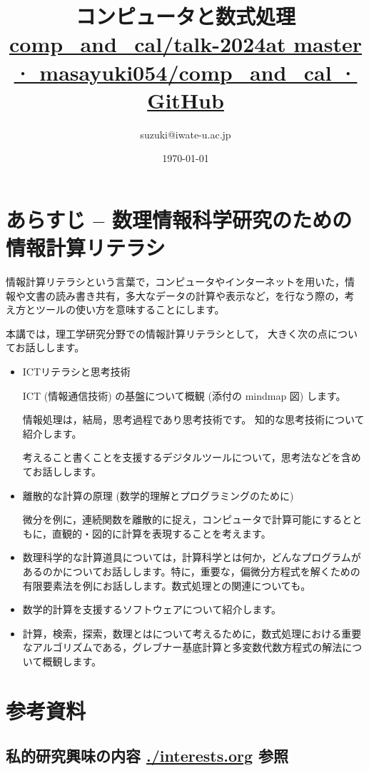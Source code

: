 \documentclass[dvipdfmx,11pat]{jarticle}
\author{suzuki@iwate-u.ac.jp}
\date{\today}
\title{ コンピュータと数式処理 \href{https://github.com/masayuki054/comp\_and\_cal/tree/master/talk-2024}{comp\_and\_cal/talk-2024at master · masayuki054/comp\_and\_cal · GitHub}}
\begin{document}
\maketitle
\section{あらすじ -- 数理情報科学研究のための情報計算リテラシ}
\label{sec:org7687947}

情報計算リテラシという言葉で，コンピュータやインターネットを用いた，情
報や文書の読み書き共有，多大なデータの計算や表示など，を行なう際の，考
え方とツールの使い方を意味することにします。

本講では，理工学研究分野での情報計算リテラシとして，
大きく次の点についてお話しします。

\begin{itemize}
\item ICTリテラシと思考技術

ICT (情報通信技術) の基盤について概観 (添付の mindmap 図) します。

情報処理は，結局，思考過程であり思考技術です。
知的な思考技術について紹介します。

考えること書くことを支援するデジタルツールについて，思考法などを含め
てお話しします。

\item 離散的な計算の原理 (数学的理解とプログラミングのために)

微分を例に，連続関数を離散的に捉え，コンピュータで計算可能にするとと
もに，直観的・図的に計算を表現することを考えます。

\item 数理科学的な計算道具については，計算科学とは何か，どんなプログラムが
あるのかについてお話しします。特に，重要な，偏微分方程式を解くための
有限要素法を例にお話しします。数式処理との関連についても。

\item 数学的計算を支援するソフトウェアについて紹介します。

\item 計算，検索，探索，数理とはについて考えるために，数式処理における重要
なアルゴリズムである，グレブナー基底計算と多変数代数方程式の解法につ
いて概観します。
\end{itemize}
\section{参考資料}
\label{sec:org1caa3eb}

\subsection{私的研究興味の内容 \url{./interests.org} 参照}
\label{sec:org6a36a4d}
\end{document}
